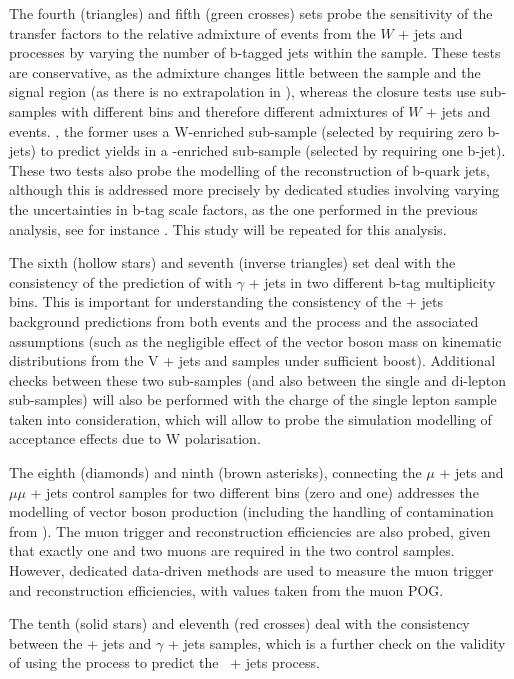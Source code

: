 The fourth (triangles) and fifth (green crosses) sets probe the
sensitivity of the transfer factors to the relative admixture of
events from the $W$ + jets and \ttbar processes by varying the number
of b-tagged jets within the \mj sample. These tests are conservative,
as the admixture changes little between the \mj sample and the signal
region (as there is no extrapolation in \nb), whereas the closure
tests use sub-samples with different \nb bins and therefore different
admixtures of $W$ + jets and \ttbar events. \eg, the former uses a
W-enriched sub-sample (selected by requiring zero b-jets) to predict
yields in a \ttbar-enriched sub-sample (selected by requiring one
b-jet).  These two tests also probe the modelling of the
reconstruction of b-quark jets, although this is addressed more
precisely by dedicated studies involving varying the uncertainties in
b-tag scale factors, as the one performed in the previous analysis,
see for instance \cite{CMS_AN_2013-366}. This study will be repeated
for this analysis.

The sixth (hollow stars) and seventh (inverse triangles) set deal with
the consistency of the prediction of \wej with $\gamma$ + jets in two
different b-tag multiplicity bins. This is important for understanding
the consistency of the \znunu + jets background predictions from both
\wej events and the \gj process and the associated assumptions (such
as the negligible effect of the vector boson mass on kinematic
distributions from the V + jets and \gj samples under sufficient
boost). Additional checks between these two sub-samples (and also
between the single and di-lepton sub-samples) will also be performed
with the charge of the single lepton sample taken into consideration,
which will allow to probe the simulation modelling of acceptance
effects due to W polarisation.

The eighth (diamonds) and ninth (brown asterisks), connecting the $\mu$
+ jets and $\mu\mu$ + jets control samples for two different \nb bins
(zero and one) addresses the modelling of vector boson production
(including the handling of contamination from \ttbar). The muon
trigger and reconstruction efficiencies are also probed, given that
exactly one and two muons are required in the two control
samples. However, dedicated data-driven methods are used to measure
the muon trigger and reconstruction efficiencies, with values taken
from the muon POG.

The tenth (solid stars) and eleventh (red crosses) deal with the
consistency between the \zee + jets and $\gamma$ + jets
samples, which is a further check on the validity of using the \gj
process to predict the \znunu\, + jets process.

